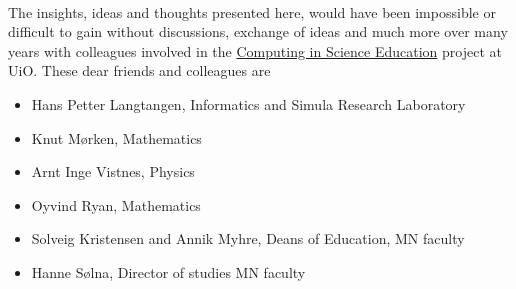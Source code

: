 \documentclass[%
oneside,                 %
final,                   %
10pt]{article}
\begin{document}
\paragraph{}
The insights, ideas and thoughts presented here, would have been impossible or difficult to gain without discussions, exchange of ideas and much more over many years with colleagues involved in the \href{{http://www.mn.uio.no/english/about/collaboration/cse/}}{Computing in Science Education} project at UiO. These dear friends and colleagues  are 
\begin{itemize}
\item Hans Petter Langtangen, Informatics and Simula Research Laboratory

\item Knut Mørken, Mathematics

\item Arnt Inge Vistnes, Physics

\item Oyvind Ryan, Mathematics

\item Solveig Kristensen and Annik Myhre, Deans of Education, MN faculty

\item Hanne Sølna, Director of studies MN faculty
\end{itemize}

\noindent












\printindex
\end{document}
